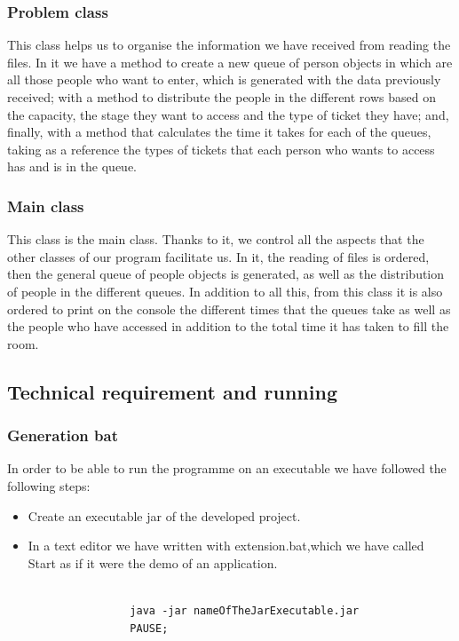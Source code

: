 \documentclass[a4paper]{article}
\theoremstyle{plain}
\theoremstyle{definition}
\begin{document}
            \subsubsection{Problem class}
            This class helps us to organise the information we have received from reading the files. In it we have a method to create a new queue of person objects in which are all those people who want to enter, which is generated with the data previously received; with a method to distribute the people in the different rows based on the capacity, the stage they want to access and the type of ticket they have; and, finally, with a method that calculates the time it takes for each of the queues, taking as a reference the types of tickets that each person who wants to access has and is in the queue. 
	        \subsubsection{Main class}
	        This class is the main class. Thanks to it, we control all the aspects that the other classes of our program facilitate us. In it, the reading of files is ordered, then the general queue of people objects is generated, as well as the distribution of people in the different queues. In addition to all this, from this class it is also ordered to print on the console the different times that the queues take as well as the people who have accessed in addition to the total time it has taken to fill the room. 
	     \subsection{Technical requirement and running}
        \subsubsection{Generation bat}
        In order to be able to run the programme on an executable we have followed the following steps:
        \begin{itemize}
            \item Create an executable jar of the developed project. 
            \item In a text editor we have written with extension.bat,which we have called Start as if it were the demo of an application.
                \begin{verbatim}

                java -jar nameOfTheJarExecutable.jar
                PAUSE;

                \end{verbatim}
        \end{itemize}
\end{document}
